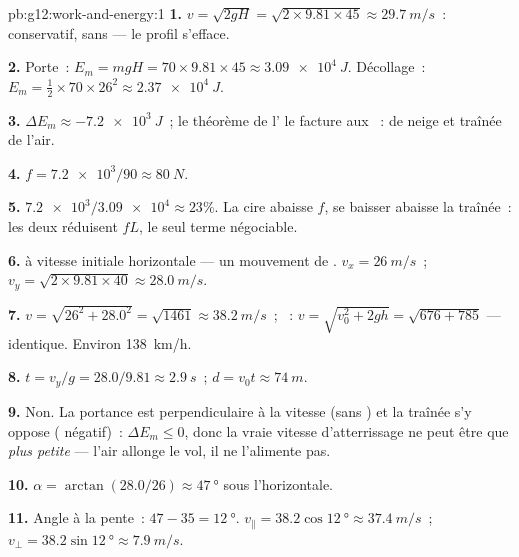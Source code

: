 \begin{solution}{pb:g12:work-and-energy:1}
\textbf{1.} $v = \sqrt{2gH} = \sqrt{2 \times 9.81 \times 45} \approx
\qty{29.7}{m/s}$~: 
conservatif,  sans
 --- le profil s'efface.

\textbf{2.} Porte~: $E_m = mgH = 70 \times 9.81 \times 45 \approx
\qty{3.09e4}{J}$. Décollage~: $E_m = \tfrac12 \times 70 \times 26^2
\approx \qty{2.37e4}{J}$.

\textbf{3.} $\Delta E_m \approx \qty{-7.2e3}{J}$~; le théorème de
l' le facture aux
~: 
de neige et traînée de l'air.

\textbf{4.} $f = \num{7.2e3}/90 \approx \qty{80}{N}$.

\textbf{5.} $\num{7.2e3}/\num{3.09e4} \approx 23\%$. La cire abaisse
$f$, se baisser abaisse la traînée~: les deux réduisent $fL$, le
seul terme négociable.

\textbf{6.}  à vitesse initiale
horizontale --- un mouvement de .
$v_x = \qty{26}{m/s}$~; $v_y = \sqrt{2 \times 9.81 \times 40} \approx
\qty{28.0}{m/s}$.

\textbf{7.} $v = \sqrt{26^2 + 28.0^2} = \sqrt{1461} \approx
\qty{38.2}{m/s}$~; ~:
$v = \sqrt{v_0^2 + 2gh} = \sqrt{676 + 785}$ --- identique. Environ
\qty{138}{km/h}.

\textbf{8.} $t = v_y/g = 28.0/9.81 \approx \qty{2.9}{s}$~;
$d = v_0 t \approx \qty{74}{m}$.

\textbf{9.} Non. La portance est perpendiculaire à la vitesse (sans
) et la traînée s'y oppose ( négatif)~:
$\Delta E_m \leq 0$, donc la vraie vitesse d'atterrissage ne peut
être que \emph{plus petite} --- l'air allonge le vol, il ne
l'alimente pas.

\textbf{10.} $\alpha = \arctan(28.0/26) \approx \qty{47}{\degree}$
sous l'horizontale.

\textbf{11.} Angle à la pente~: $47 - 35 = \qty{12}{\degree}$.
$v_\parallel = 38.2\cos\qty{12}{\degree} \approx \qty{37.4}{m/s}$~;
$v_\perp = 38.2\sin\qty{12}{\degree} \approx \qty{7.9}{m/s}$.


\end{solution}
